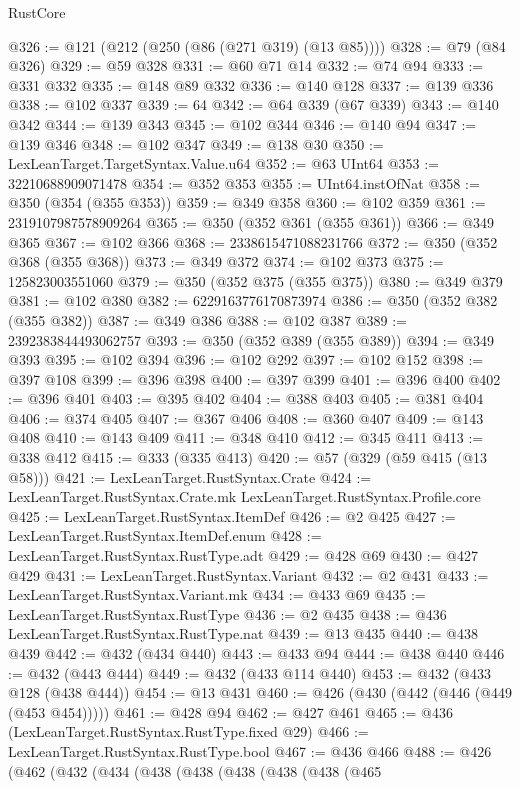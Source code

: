\begin{lexlean}{RustCore}
\begin{coremodule}
@326 := @121 (@212 (@250 (@86 (@271 @319) (@13 @85))))
@328 := @79 (@84 @326)
@329 := @59 @328
@331 := @60 @71 @14
@332 := @74 @94
@333 := @331 @332
@335 := @148 @89 @332
@336 := @140 @128
@337 := @139 @336
@338 := @102 @337
@339 := 64
@342 := @64 @339 (@67 @339)
@343 := @140 @342
@344 := @139 @343
@345 := @102 @344
@346 := @140 @94
@347 := @139 @346
@348 := @102 @347
@349 := @138 @30
@350 := LexLeanTarget.TargetSyntax.Value.u64
@352 := @63 UInt64
@353 := 32210688909071478
@354 := @352 @353
@355 := UInt64.instOfNat
@358 := @350 (@354 (@355 @353))
@359 := @349 @358
@360 := @102 @359
@361 := 2319107987578909264
@365 := @350 (@352 @361 (@355 @361))
@366 := @349 @365
@367 := @102 @366
@368 := 2338615471088231766
@372 := @350 (@352 @368 (@355 @368))
@373 := @349 @372
@374 := @102 @373
@375 := 125823003551060
@379 := @350 (@352 @375 (@355 @375))
@380 := @349 @379
@381 := @102 @380
@382 := 6229163776170873974
@386 := @350 (@352 @382 (@355 @382))
@387 := @349 @386
@388 := @102 @387
@389 := 2392383844493062757
@393 := @350 (@352 @389 (@355 @389))
@394 := @349 @393
@395 := @102 @394
@396 := @102 @292
@397 := @102 @152
@398 := @397 @108
@399 := @396 @398
@400 := @397 @399
@401 := @396 @400
@402 := @396 @401
@403 := @395 @402
@404 := @388 @403
@405 := @381 @404
@406 := @374 @405
@407 := @367 @406
@408 := @360 @407
@409 := @143 @408
@410 := @143 @409
@411 := @348 @410
@412 := @345 @411
@413 := @338 @412
@415 := @333 (@335 @413)
@420 := @57 (@329 (@59 @415 (@13 @58)))
@421 := LexLeanTarget.RustSyntax.Crate
@424 := LexLeanTarget.RustSyntax.Crate.mk LexLeanTarget.RustSyntax.Profile.core
@425 := LexLeanTarget.RustSyntax.ItemDef
@426 := @2 @425
@427 := LexLeanTarget.RustSyntax.ItemDef.enum
@428 := LexLeanTarget.RustSyntax.RustType.adt
@429 := @428 @69
@430 := @427 @429
@431 := LexLeanTarget.RustSyntax.Variant
@432 := @2 @431
@433 := LexLeanTarget.RustSyntax.Variant.mk
@434 := @433 @69
@435 := LexLeanTarget.RustSyntax.RustType
@436 := @2 @435
@438 := @436 LexLeanTarget.RustSyntax.RustType.nat
@439 := @13 @435
@440 := @438 @439
@442 := @432 (@434 @440)
@443 := @433 @94
@444 := @438 @440
@446 := @432 (@443 @444)
@449 := @432 (@433 @114 @440)
@453 := @432 (@433 @128 (@438 @444))
@454 := @13 @431
@460 := @426 (@430 (@442 (@446 (@449 (@453 @454)))))
@461 := @428 @94
@462 := @427 @461
@465 := @436 (LexLeanTarget.RustSyntax.RustType.fixed @29)
@466 := LexLeanTarget.RustSyntax.RustType.bool
@467 := @436 @466
@488 := @426
    (@462
      (@432
        (@434
          (@438
            (@438
              (@438
                (@438
                  (@438
                    (@465

\end{coremodule}
\end{lexlean}
